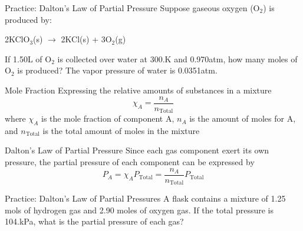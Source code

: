 \documentclass[11pt]{beamer}
\begin{document}
\begin{frame}{Practice: Dalton's Law of Partial Pressure}
  Suppose gaseous oxygen (O$_2$) is produced by:

  2KClO$_3$(s) $\rightarrow$ 2KCl(s) + 3O$_2$(g)

  If 1.50L of O$_2$ is collected over water at 300.K and 0.970atm,
  how many moles of O$_2$ is produced? The vapor pressure of water
  is 0.0351atm.
  \vspace{1.3in}
\end{frame}

\begin{frame}{Mole Fraction}
  Expressing the relative amounts of substances in a mixture
  \begin{equation}
    \chi_A = \frac{n_A}{n_\text{Total}}
  \end{equation}
  where $\chi_A$ is the mole fraction of component A, $n_A$ is the
  amount of moles for A, and $n_\text{Total}$ is the total amount of
  moles in the mixture
\end{frame}

\begin{frame}{Dalton's Law of Partial Pressure}
  Since each gas component exert its own pressure, the partial pressure
  of each component can be expressed by
  \begin{equation}
    P_A = \chi_A P_\text{Total} = \frac{n_A}{n_\text{Total}} P_\text{Total}
  \end{equation}
\end{frame}

\begin{frame}{Practice: Dalton's Law of Partial Pressures}
  A flask contains a mixture of 1.25 mols of hydrogen gas and 2.90 moles
  of oxygen gas. If the total pressure is 104.kPa, what is the partial
  pressure of each gas?
  \vspace{1.5in}
\end{frame}
\end{document}
